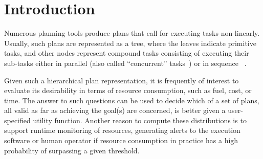 \documentclass[review]{elsarticle}
\begin{document}
\section{Introduction}

Numerous planning tools produce plans that call for executing tasks non-linearly.
Usually, such plans are represented as a tree, where the
leaves indicate primitive tasks, and other nodes represent compound tasks consisting of executing their sub-tasks either in parallel (also called ``concurrent'' tasks~\cite{gabaldon2002programming}) or in sequence ~\cite{erol1994htn,nau1998control,nau2003shop2,kelly2008offline}.

Given such a hierarchical plan representation, it is frequently of interest to evaluate its desirability in terms of resource consumption, such as fuel, cost, or time. The answer to such questions can be used to decide which of a set of plans, all valid as far as achieving the goal(s) are concerned, is better given a user-specified utility function. Another reason to compute these distributions is to support runtime monitoring of resources, generating alerts to the execution software or human operator if resource consumption in practice has a high probability of surpassing a given threshold.
\end{document}
